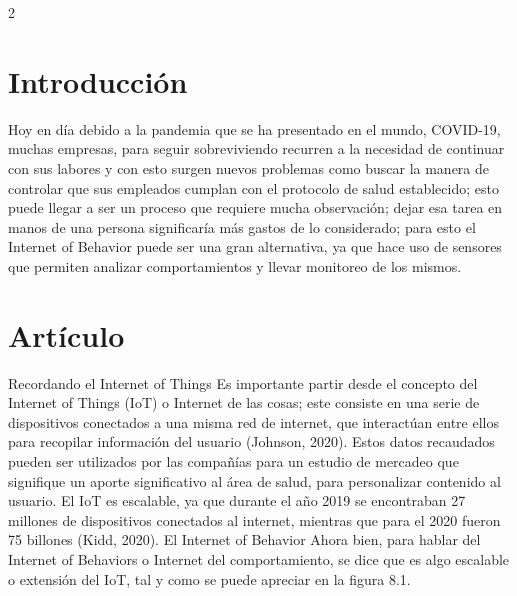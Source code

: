 \documentclass[12pt,spanish,Letterpaper,openany]{book}
\begin{document}
\begin {multicols}{2}
\hypertarget{introducciuxf3n-6}{%
\section{Introducción}\label{introducciuxf3n-6}}

Hoy en día debido a la pandemia que se ha presentado en el mundo, COVID-19, muchas empresas, para seguir sobreviviendo recurren a la necesidad de continuar con sus labores y con esto surgen nuevos problemas como buscar la manera de controlar que sus empleados cumplan con el protocolo de salud establecido; esto puede llegar a ser un proceso que requiere mucha observación; dejar esa tarea en manos de una persona significaría más gastos de lo considerado; para esto el Internet of Behavior puede ser una gran alternativa, ya que hace uso de sensores que permiten analizar comportamientos y llevar monitoreo de los mismos.

\hypertarget{artuxedculo-6}{%
\section{Artículo}\label{artuxedculo-6}}

Recordando el Internet of Things
Es importante partir desde el concepto del Internet of Things (IoT) o Internet de las cosas; este consiste en una serie de dispositivos conectados a una misma red de internet, que interactúan entre ellos para recopilar información del usuario (Johnson, 2020). Estos datos recaudados pueden ser utilizados por las compañías para un estudio de mercadeo que signifique un aporte significativo al área de salud, para personalizar contenido al usuario.
El IoT es escalable, ya que durante el año 2019 se encontraban 27 millones de dispositivos conectados al internet, mientras que para el 2020 fueron 75 billones (Kidd, 2020).
El Internet of Behavior
Ahora bien, para hablar del Internet of Behaviors o Internet del comportamiento, se dice que es algo escalable o extensión del IoT, tal y como se puede apreciar en la figura 8.1.

\begin {flushleft}
\noindent\begin{minipage}[c]{\columnwidth}


\end{minipage}
\end{flushleft}
\end{multicols}
\end{document}

